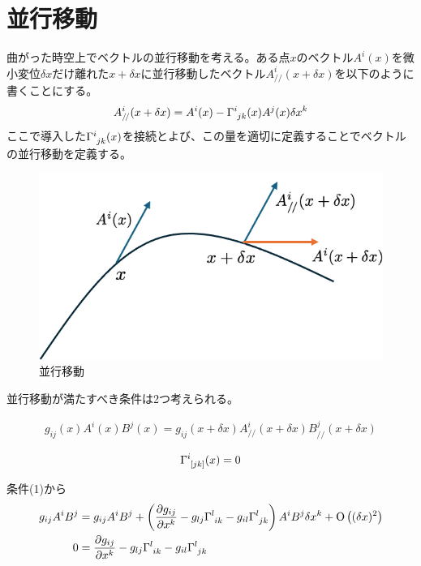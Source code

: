 \documentclass[dvipdfmx]{report} %
\begin{document}
\section{並行移動}
曲がった時空上でベクトルの並行移動を考える。ある点$x$のベクトル$A^i(x)$を微小変位$\delta x$だけ離れた$x + \delta x $に並行移動したベクトル$A^i_{/\!/}(x + \delta x)$を以下のように書くことにする。
\[
A^i_{/\!/}(x + \delta x) = A^i(x) - \tensor{\Gamma}{^i_{jk}}(x) A^j(x) \delta x^k
\]
ここで導入した$\tensor{\Gamma}{^i_{jk}}(x)$を接続とよび、この量を適切に定義することでベクトルの並行移動を定義する。
\begin{figure}[H]
    \centering
    \includegraphics[width=0.5\columnwidth]{./images/0106/01.png}
    \caption{並行移動}
    \label{}
\end{figure}
並行移動が満たすべき条件は2つ考えられる。
\begin{tcolorbox}[title=条件(1)：並行移動によって任意の2つのベクトルの内積が保たれる]
\begin{eqnarray*}
	g_{ij}(x) A^i (x) B^j (x) = g_{ij}(x + \delta x) A^i_{/\!/} (x + \delta x) B^j_{/\!/} (x + \delta x)
\end{eqnarray*}

\end{tcolorbox}
\begin{tcolorbox}[title=条件(2)：並行移動によって任意の2つのベクトルにねじれが生じない]
\begin{eqnarray*}
	\tensor{\Gamma}{^i_{[jk]}}(x) = 0
\end{eqnarray*}
\end{tcolorbox}
条件(1)から
\begin{equation*}
\begin{split}
	g_{ij}A^iB^j 
		&= g_{ij}A^iB^j
		+ \left( \frac{\partial g_{ij}}{\partial x^k}
		- g_{lj}\tensor{\Gamma}{^l_{ik}}
		- g_{il} \tensor{\Gamma}{^l_{jk}} \right) A^i B^j \delta x^k
		+ \mathrm{ O } \left( (\delta x)^2 \right)\\
	0 
		&= \frac{\partial g_{ij}}{\partial x^k}
		- g_{lj} \tensor{\Gamma}{^l_{ik}}
		- g_{il} \tensor{\Gamma}{^l_{jk}}
\end{split}
\end{equation*}
\end{document}
